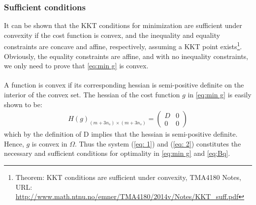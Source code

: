 \documentclass[10pt,a4paper]{article}
\begin{document}
\subsubsection{Sufficient conditions}
It can be shown that the KKT conditions for minimization are sufficient under convexity if the cost function is convex, and the inequality and equality constraints are concave and affine, respectively, assuming a KKT point exists\footnote{Theorem: KKT conditions are sufficient under convexity, TMA4180 Notes, URL: \url{http://www.math.ntnu.no/emner/TMA4180/2014v/Notes/KKT_suff.pdf}}. Obviously, the equality constraints are affine, and with no inequality constraints, we only need to prove that \eqref{eq:min g} is convex.
\\\\
A function is convex if its corresponding hessian is semi-positive definite on the interior of the convex set. The hessian of the cost function $g$ in \eqref{eq:min g} is easily shown to be:
\begin{align}
H(g)_{(m+3n_s) \times (m+3n_s)} = 
\begin{pmatrix}
D & 0 \\
0 & 0
\end{pmatrix}
\end{align}
which by the definition of D implies that the hessian is semi-positive definite.
Hence, $g$ is convex in $\Omega$. Thus the system (\ref{eq: 1}) and (\ref{eq: 2}) constitutes the necessary and sufficient conditions for optimality in \eqref{eq:min g} and \eqref{eq:Bq}.
\end{document}
